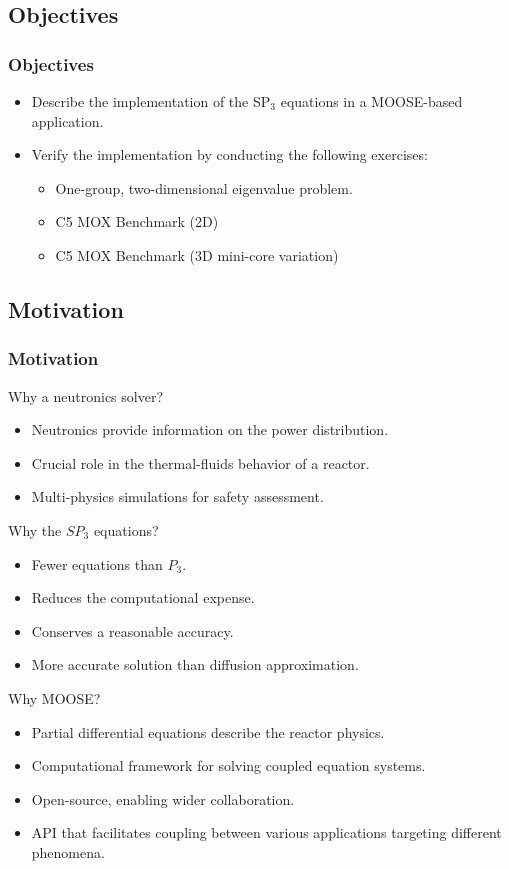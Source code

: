 \subsection{Objectives}

\begin{frame}
\frametitle{Objectives}
  \begin{itemize}
    \item Describe the implementation of the SP$_3$ equations in a MOOSE-based application.
    \item Verify the implementation by conducting the following exercises:
      \begin{itemize}
        \item One-group, two-dimensional eigenvalue problem.
        \item C5 MOX Benchmark (2D)
        \item C5 MOX Benchmark (3D mini-core variation)
  	  \end{itemize}
  \end{itemize}
\end{frame}


\subsection{Motivation}

\begin{frame}
\frametitle{Motivation}
  
  Why a neutronics solver?
  \begin{itemize}
    \item Neutronics provide information on the power distribution.
    \item Crucial role in the thermal-fluids behavior of a reactor.
    \item Multi-physics simulations for safety assessment.
  \end{itemize}

  Why the $SP_3$ equations?
  \begin{itemize}
    \item Fewer equations than $P_3$.
    \item Reduces the computational expense.
    \item Conserves a reasonable accuracy.
    \item More accurate solution than diffusion approximation.
  \end{itemize}
  
  Why MOOSE?
  \begin{itemize}
    \item Partial differential equations describe the reactor physics.
    \item Computational framework for solving coupled equation systems.
    \item Open-source, enabling wider collaboration.
    \item API that facilitates coupling between various applications targeting different phenomena.
  \end{itemize}

\end{frame}
